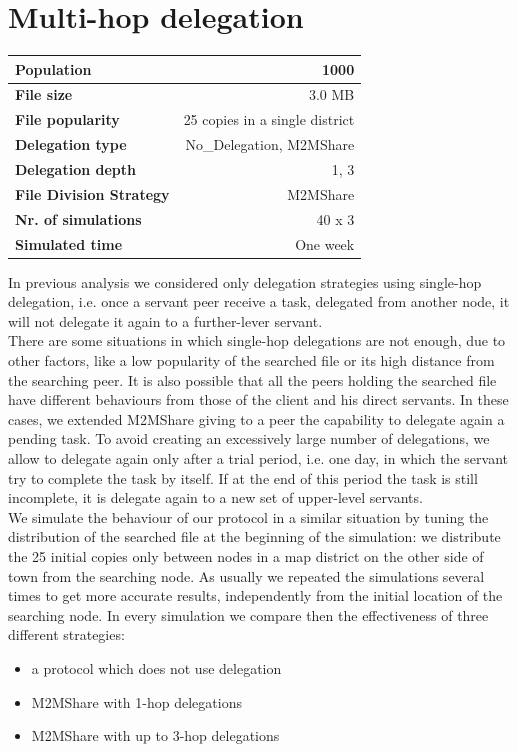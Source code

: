 \section{Multi-hop delegation}
\begin{table}[h]
\begin{center}
\begin{tabular}{|l|r|}
\hline
\bfseries Population & 1000 \\
\hline
\bfseries File size & 3.0 MB \\
\hline
\bfseries File popularity & 25 copies in a single district \\
\hline
\bfseries Delegation type & No\_Delegation, M2MShare\\
\hline
\bfseries Delegation depth & 1, 3 \\
\hline
\bfseries File Division Strategy & M2MShare \\
\hline
\bfseries Nr. of simulations & 40 x 3\\
\hline
\bfseries Simulated time & One week \\
\hline
\end{tabular}
\end{center}
\end{table}
In previous analysis we considered only delegation strategies using single-hop delegation, i.e. once a servant peer receive a task, delegated from another node, it will not delegate it again to a further-lever servant. 
\\

There are some situations in which single-hop delegations are not enough, due to other factors, like a low popularity of the searched file or its high distance from the searching peer. It is also possible that all the peers holding the searched file have different behaviours from those of the client and his direct servants. In these cases, we extended M2MShare giving to a peer the capability to delegate again a pending task. To avoid creating an excessively large number of delegations, we allow to delegate again only after a trial period, i.e. one day, in which the servant try to complete the task by itself. If at the end of this period the task is still incomplete, it is delegate again to a new set of upper-level servants.
\\

We simulate the behaviour of our protocol in a similar situation by tuning the distribution of the searched file at the beginning of the simulation: we distribute the 25 initial copies only between nodes in a map district on the other side of town from the searching node. As usually we repeated the simulations several times to get more accurate results, independently from the initial location of the searching node. In every simulation we compare then the effectiveness of three different strategies:
\begin{itemize}
\item a protocol which does not use delegation
\item M2MShare with 1-hop delegations
\item M2MShare with up to 3-hop delegations
\end{itemize}

